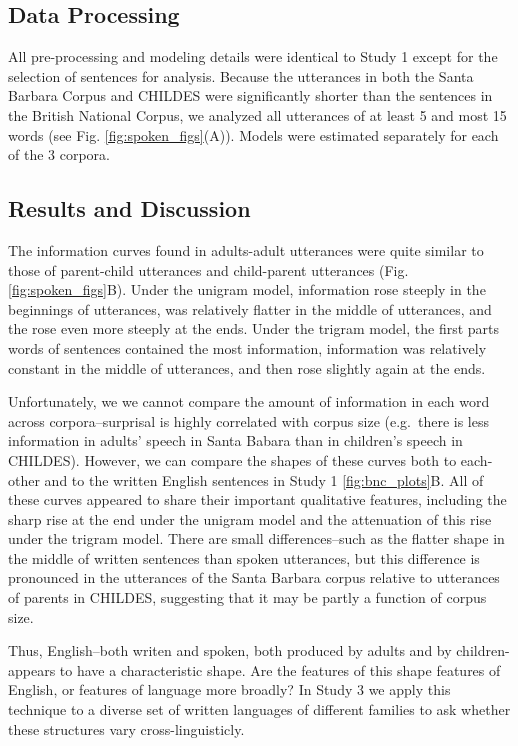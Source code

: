 \documentclass[10pt, letterpaper]{article}
\begin{document}
\hypertarget{data-processing}{%
\subsection{Data Processing}\label{data-processing}}

All pre-processing and modeling details were identical to Study 1 except
for the selection of sentences for analysis. Because the utterances in
both the Santa Barbara Corpus and CHILDES were significantly shorter
than the sentences in the British National Corpus, we analyzed all
utterances of at least 5 and most 15 words (see Fig.
\ref{fig:spoken_figs}(A)). Models were estimated separately for each of
the 3 corpora.

\hypertarget{results-and-discussion-1}{%
\subsection{Results and Discussion}\label{results-and-discussion-1}}

The information curves found in adults-adult utterances were quite
similar to those of parent-child utterances and child-parent utterances
(Fig. \ref{fig:spoken_figs}B). Under the unigram model, information rose
steeply in the beginnings of utterances, was relatively flatter in the
middle of utterances, and the rose even more steeply at the ends. Under
the trigram model, the first parts words of sentences contained the most
information, information was relatively constant in the middle of
utterances, and then rose slightly again at the ends.

Unfortunately, we we cannot compare the amount of information in each
word across corpora--surprisal is highly correlated with corpus size
(e.g.~there is less information in adults' speech in Santa Babara than
in children's speech in CHILDES). However, we can compare the shapes of
these curves both to each-other and to the written English sentences in
Study 1 \ref{fig:bnc_plots}B. All of these curves appeared to share
their important qualitative features, including the sharp rise at the
end under the unigram model and the attenuation of this rise under the
trigram model. There are small differences--such as the flatter shape in
the middle of written sentences than spoken utterances, but this
difference is pronounced in the utterances of the Santa Barbara corpus
relative to utterances of parents in CHILDES, suggesting that it may be
partly a function of corpus size.

Thus, English--both writen and spoken, both produced by adults and by
children-appears to have a characteristic shape. Are the features of
this shape features of English, or features of language more broadly? In
Study 3 we apply this technique to a diverse set of written languages of
different families to ask whether these structures vary
cross-linguisticly.
\end{document}
